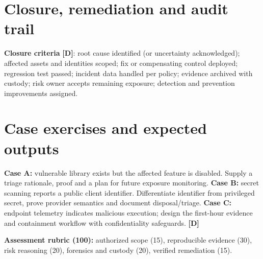 \documentclass[10pt,letterpaper,oneside]{article}
\newcommand{\designed}{\textsf{\color{accent}\textbf{[D]}}}
\begin{document}
\section{Closure, remediation and audit trail}
\begin{warningbox}\textbf{Closure criteria} \designed{}: root cause identified (or uncertainty acknowledged); affected assets and identities scoped; fix or compensating control deployed; regression test passed; incident data handled per policy; evidence archived with custody; risk owner accepts remaining exposure; detection and prevention improvements assigned.\end{warningbox}

\section{Case exercises and expected outputs}
\textbf{Case A:} vulnerable library exists but the affected feature is disabled. Supply a triage rationale, proof and a plan for future exposure monitoring. \textbf{Case B:} secret scanning reports a public client identifier. Differentiate identifier from privileged secret, prove provider semantics and document disposal/triage. \textbf{Case C:} endpoint telemetry indicates malicious execution; design the first-hour evidence and containment workflow with confidentiality safeguards. \designed{}
\begin{sourcebox}\textbf{Assessment rubric (100):} authorized scope (15), reproducible evidence (30), risk reasoning (20), forensics and custody (20), verified remediation (15).\end{sourcebox}
\end{document}
